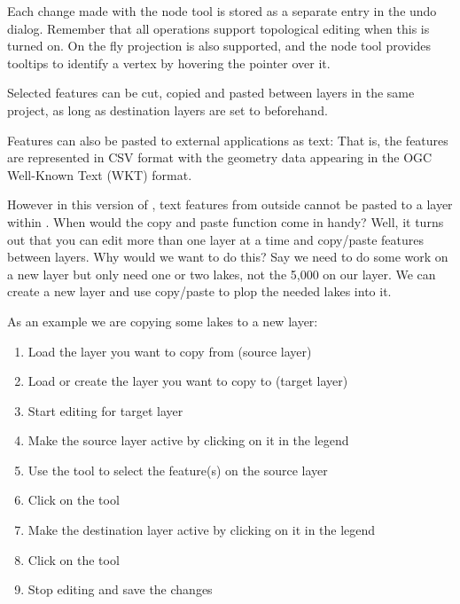 Each change made with the node tool is stored as a separate entry in the undo dialog.
Remember that all operations support topological editing when this is turned on.
On the fly projection is also supported, and the node tool provides tooltips to
identify a vertex by hovering the pointer over it.


Selected features can be cut, copied and pasted between layers in the
same \qg project, as long as destination layers are set to
 beforehand.

Features can also be pasted to external applications as text:  That is,
the features are represented in CSV format with the geometry data appearing
in the OGC Well-Known Text (WKT) format.

However in this version of \qg, text features from outside \qg cannot
be pasted to a layer within \qg. When would the copy and paste function
come in handy? Well, it turns out that you can edit more than one layer
at a time and copy/paste features between layers. Why would we want to do
this?  Say we need to do some work on a new layer but only need one or
two lakes, not the 5,000 on our  layer. We can create
a new layer and use copy/paste to plop the needed lakes into it.

As an example we are copying some lakes to a new layer:

\begin{enumerate}
\item Load the layer you want to copy from (source layer)
\item Load or create the layer you want to copy to (target layer)
\item Start editing for target layer
\item Make the source layer active by clicking on it in the legend
\item Use the  tool to select the feature(s) on the source layer
\item Click on the  tool
\item Make the destination layer active by clicking on it in the legend
\item Click on the  tool
\item Stop editing and save the changes
\end{enumerate}

